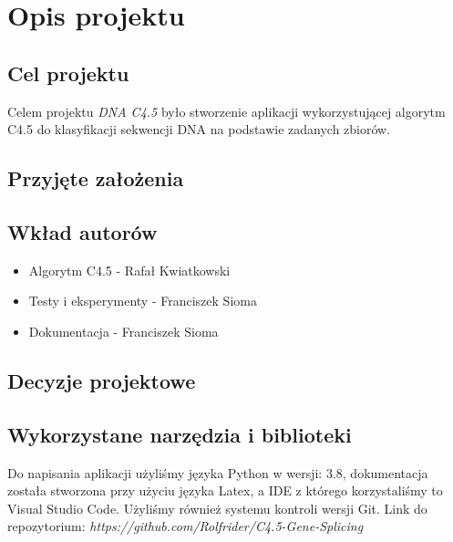 \section{Opis projektu}
\subsection{Cel projektu}
Celem projektu {\it DNA C4.5} było stworzenie aplikacji wykorzystującej algorytm C4.5 do klasyfikacji sekwencji DNA na podstawie zadanych zbiorów. 

\subsection{Przyjęte założenia}

\subsection{Wkład autorów}
\begin{itemize}
    \item Algorytm C4.5 - Rafał Kwiatkowski
    \item Testy i eksperymenty - Franciszek Sioma
    \item Dokumentacja - Franciszek Sioma
\end{itemize}
\subsection{Decyzje projektowe}

\subsection{Wykorzystane narzędzia i biblioteki}
Do napisania aplikacji użyliśmy języka Python w wersji: 3.8, dokumentacja została stworzona przy użyciu języka Latex, a IDE z którego korzystaliśmy to Visual Studio Code. Użyliśmy również systemu kontroli wersji Git.
Link do repozytorium: {\it https://github.com/Rolfrider/C4.5-Gene-Splicing}
